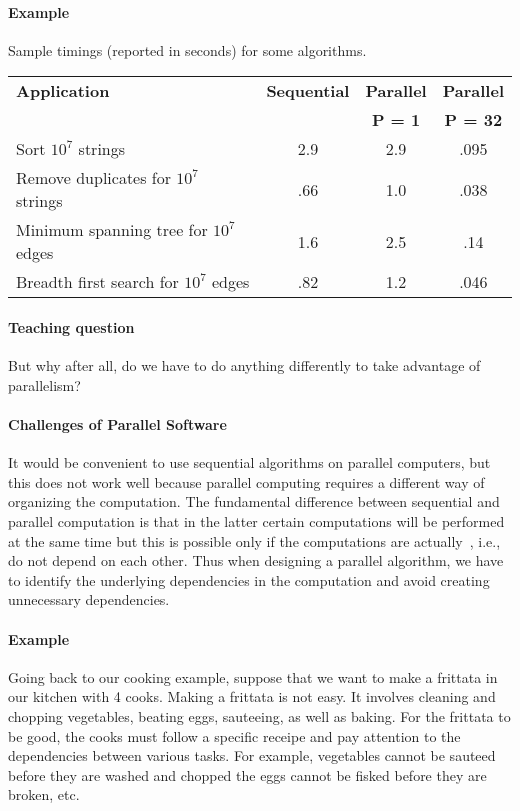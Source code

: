 \paragraph{Example}
Sample timings (reported in seconds) for some algorithms.
  \begin{center}
  \begin{tabular}{l  c c c}
    \toprule
    \textbf{Application} & \textbf{Sequential} & \textbf{Parallel} &
    \textbf{Parallel}
\\
     & & \textbf{P = 1} & \textbf{P = 32}
\\
    \midrule
    Sort $10^7$ strings &        2.9 &  2.9 &  .095\\
    Remove duplicates for $10^7$ strings &      .66 &  1.0 & .038\\
    Minimum spanning tree for $10^7$ edges    &    1.6 & 2.5  & .14\\
    Breadth first search for $10^7$ edges  &   .82  & 1.2 &  .046\\
    \bottomrule
  \end{tabular}
  \end{center}

\paragraph{Teaching question}
But why after all, do we have to do anything differently to take
advantage of parallelism?

\paragraph{Challenges of Parallel Software}
It would be convenient to use sequential algorithms on parallel
computers, but this does not work well because parallel computing
requires a different way of organizing the computation.
%
The fundamental difference between sequential and parallel computation
is that in the latter certain computations will be performed at the
same time but this is possible only if the computations are actually~, i.e., do not depend on each other.
%
Thus when designing a parallel algorithm, we have to identify the
underlying dependencies in the computation and avoid creating
unnecessary dependencies.

\paragraph{Example}
Going back to our cooking example, suppose that we want to make a
frittata in our kitchen with 4 cooks.
%
Making a frittata is not easy.
%
It involves cleaning and chopping vegetables, beating eggs,
sauteeing, as well as baking.
%
For the frittata to be good, the cooks must follow a specific receipe
and pay attention to the dependencies between various tasks.
%
For example,
%
vegetables cannot be sauteed before they are washed and chopped
%
the eggs cannot be fisked before they are broken, etc.
%

